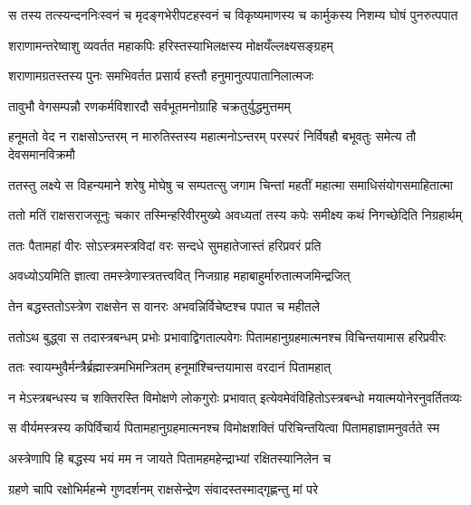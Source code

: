 \fourlineindentedshloka
{स तस्य तत्स्यन्दननिःस्वनं च}
{मृदङ्गभेरीपटहस्वनं च}
{विकृष्यमाणस्य च कार्मुकस्य}
{निशम्य घोषं पुनरुत्पपात} %

\twolineshloka
{शराणामन्तरेष्वाशु व्यवर्तत महाकपिः}
{हरिस्तस्याभिलक्षस्य मोक्षयँल्लक्ष्यसङ्ग्रहम्} %

\twolineshloka
{शराणामग्रतस्तस्य पुनः समभिवर्तत}
{प्रसार्य हस्तौ हनुमानुत्पपातानिलात्मजः} %

\twolineshloka
{तावुभौ वेगसम्पन्नौ रणकर्मविशारदौ}
{सर्वभूतमनोग्राहि चक्रतुर्युद्धमुत्तमम्} %

\fourlineindentedshloka
{हनूमतो वेद न राक्षसोऽन्तरम्}
{न मारुतिस्तस्य महात्मनोऽन्तरम्}
{परस्परं निर्विषहौ बभूवतुः}
{समेत्य तौ देवसमानविक्रमौ} %

\fourlineindentedshloka
{ततस्तु लक्ष्ये स विहन्यमाने}
{शरेषु मोघेषु च सम्पतत्सु}
{जगाम चिन्तां महतीं महात्मा}
{समाधिसंयोगसमाहितात्मा} %

\fourlineindentedshloka
{ततो मतिं राक्षसराजसूनुः}
{चकार तस्मिन्हरिवीरमुख्ये}
{अवध्यतां तस्य कपेः समीक्ष्य}
{कथं निगच्छेदिति निग्रहार्थम्} %

\twolineshloka
{ततः पैतामहां वीरः सोऽस्त्रमस्त्रविदां वरः}
{सन्दधे सुमहातेजास्तं हरिप्रवरं प्रति} %

\twolineshloka
{अवध्योऽयमिति ज्ञात्वा तमस्त्रेणास्त्रतत्त्ववित्}
{निजग्राह महाबाहुर्मारुतात्मजमिन्द्रजित्} %

\twolineshloka
{तेन बद्धस्ततोऽस्त्रेण राक्षसेन स वानरः}
{अभवन्निर्विचेष्टश्च पपात च महीतले} %

\fourlineindentedshloka
{ततोऽथ बुद्ध्वा स तदास्त्रबन्धम्}
{प्रभोः प्रभावाद्विगताल्पवेगः}
{पितामहानुग्रहमात्मनश्च}
{विचिन्तयामास हरिप्रवीरः} %

\twolineshloka
{ततः स्वायम्भुवैर्मन्त्रैर्ब्रह्मास्त्रमभिमन्त्रितम्}
{हनूमांश्चिन्तयामास वरदानं पितामहात्} %

\fourlineindentedshloka
{न मेऽस्त्रबन्धस्य च शक्तिरस्ति}
{विमोक्षणे लोकगुरोः प्रभावात्}
{इत्येवमेवंविहितोऽस्त्रबन्धो}
{मयात्मयोनेरनुवर्तितव्यः} %

\fourlineindentedshloka
{स वीर्यमस्त्रस्य कपिर्विचार्य}
{पितामहानुग्रहमात्मनश्च}
{विमोक्षशक्तिं परिचिन्तयित्वा}
{पितामहाज्ञामनुवर्तते स्म} %

\twolineshloka
{अस्त्रेणापि हि बद्धस्य भयं मम न जायते}
{पितामहमहेन्द्राभ्यां रक्षितस्यानिलेन च} %

\twolineshloka
{ग्रहणे चापि रक्षोभिर्महन्मे गुणदर्शनम्}
{राक्षसेन्द्रेण संवादस्तस्माद्गृह्णन्तु मां परे} %


